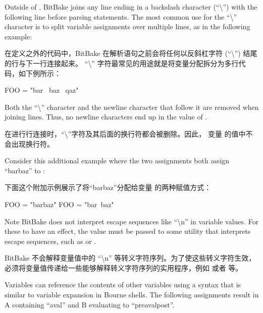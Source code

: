 
Outside of , BitBake joins any line ending in a backslash character (``\textbackslash'') with the following line before parsing statements. The most common use for the ``\textbackslash'' character is to split variable assignments over multiple lines, as in the following example:

在定义之外的代码中，BitBake 在解析语句之前会将任何以反斜杠字符 (``\textbackslash'') 结尾的行与下一行连接起来。 ``\textbackslash'' 字符最常见的用途就是将变量分配拆分为多行代码，如下例所示：

\begin{pyglist}
FOO = "bar \
       baz \
       qaz"
\end{pyglist}

Both the ``\textbackslash'' character and the newline character that follow it are removed when joining lines. Thus, no newline characters end up in the value of .

在进行行连接时，``\textbackslash''字符及其后面的换行符都会被删除。因此， 变量  的值中不会出现换行符。

Consider this additional example where the two assignments both assign ``barbaz'' to \code{FOO}:

下面这个附加示例展示了将``barbaz''分配给变量 \code{FOO} 的两种赋值方式：

\begin{pyglist}
FOO = "barbaz"
FOO = "bar\
baz"
\end{pyglist}

\begin{noteblock}{Note}%
BitBake does not interpret escape sequences like ``\textbackslash n'' in variable values. For these to have an effect, the value must be passed to some utility that interprets escape sequences, such as  or .

\medskip
BitBake 不会解释变量值中的 ``\textbackslash n'' 等转义字符序列。为了使这些转义字符生效，必须将变量值传递给一些能够解释转义字符序列的实用程序，例如 \code{printf} 或者 \code{echo -n} 等。
\end{noteblock}


\label{section:Variable Expansion}

Variables can reference the contents of other variables using a syntax that is similar to variable expansion in Bourne shells. The following assignments result in A containing ``aval'' and B evaluating to ``preavalpost''.

